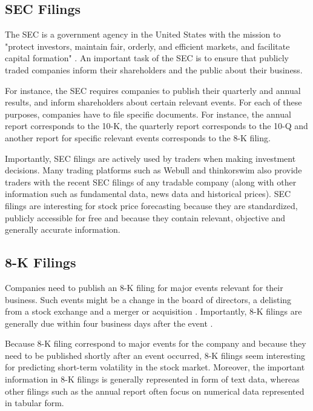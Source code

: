 \documentclass{article}
\begin{document}
	\subsection{SEC Filings}
	
	The SEC is a government agency in the United States with the mission to "protect investors, maintain fair, orderly, and efficient markets, and facilitate capital formation" \cite{noauthor_sec.gov_nodate}. An important task of the SEC is to ensure that publicly traded companies inform their shareholders and the public about their business.
	
	For instance, the SEC requires companies to publish their quarterly and annual results, and inform shareholders about certain relevant events. For each of these purposes, companies have to file specific documents. For instance, the annual report corresponds to the 10-K, the quarterly report corresponds to the 10-Q and another report for specific relevant events corresponds to the 8-K filing.
	
	Importantly, SEC filings are actively used by traders when making investment decisions. Many trading platforms such as Webull and thinkorswim also provide traders with the recent SEC filings of any tradable company (along with other information such as fundamental data, news data and historical prices). SEC filings are interesting for stock price forecasting because they are standardized, publicly accessible for free and because they contain relevant, objective and generally accurate information.
	
	
	\subsection{8-K Filings}
	
	Companies need to publish an 8-K filing for major events relevant for their business. Such events might be a change in the board of directors, a delisting from a stock exchange and a merger or acquisition \cite{noauthor_sec.gov_nodate-1}. Importantly, 8-K filings are generally due within four business days after the event \cite{kenton_8-k_nodate}. 
	
	Because 8-K filing correspond to major events for the company and because they need to be published shortly after an event occurred, 8-K filings seem interesting for predicting short-term volatility in the stock market. Moreover, the important information in 8-K filings is generally represented in form of text data, whereas other filings such as the annual report often focus on numerical data represented in tabular form.
	
\end{document}
